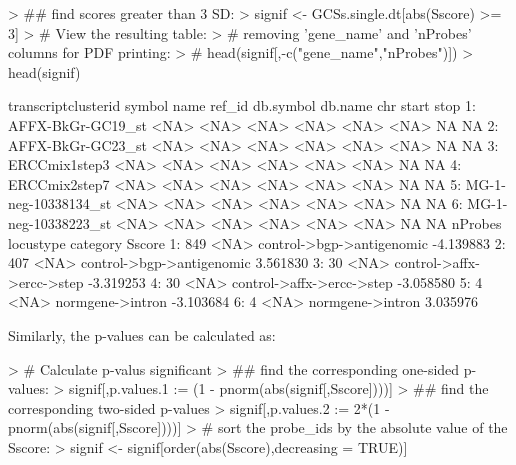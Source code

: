 \documentclass[12pt]{article}
\begin{document}
\begin{Schunk}
\begin{Sinput}
> ## find scores greater than 3 SD:
> signif <- GCSs.single.dt[abs(Sscore) >= 3]
> # View the resulting table:
> # removing 'gene_name' and 'nProbes' columns for PDF printing:
> # head(signif[,-c("gene_name","nProbes")])
> head(signif)
\end{Sinput}
\begin{Soutput}
    transcriptclusterid symbol name ref_id db.symbol db.name  chr start stop
1:    AFFX-BkGr-GC19_st   <NA> <NA>   <NA>      <NA>    <NA> <NA>    NA   NA
2:    AFFX-BkGr-GC23_st   <NA> <NA>   <NA>      <NA>    <NA> <NA>    NA   NA
3:        ERCCmix1step3   <NA> <NA>   <NA>      <NA>    <NA> <NA>    NA   NA
4:        ERCCmix2step7   <NA> <NA>   <NA>      <NA>    <NA> <NA>    NA   NA
5: MG-1-neg-10338134_st   <NA> <NA>   <NA>      <NA>    <NA> <NA>    NA   NA
6: MG-1-neg-10338223_st   <NA> <NA>   <NA>      <NA>    <NA> <NA>    NA   NA
   nProbes locustype                  category    Sscore
1:     849      <NA> control->bgp->antigenomic -4.139883
2:     407      <NA> control->bgp->antigenomic  3.561830
3:      30      <NA> control->affx->ercc->step -3.319253
4:      30      <NA> control->affx->ercc->step -3.058580
5:       4      <NA>          normgene->intron -3.103684
6:       4      <NA>          normgene->intron  3.035976
\end{Soutput}
\end{Schunk}

Similarly, the p-values can be calculated as:

\begin{Schunk}
\begin{Sinput}
> # Calculate p-valus significant
> ## find the corresponding one-sided p-values:
> signif[,p.values.1 := (1 - pnorm(abs(signif[,Sscore])))]
> ## find the corresponding two-sided p-values
> signif[,p.values.2 := 2*(1 - pnorm(abs(signif[,Sscore])))]
> # sort the probe_ids by the absolute value of the Sscore:
> signif <- signif[order(abs(Sscore),decreasing = TRUE)]
\end{Sinput}
\end{Schunk}
\end{document}
